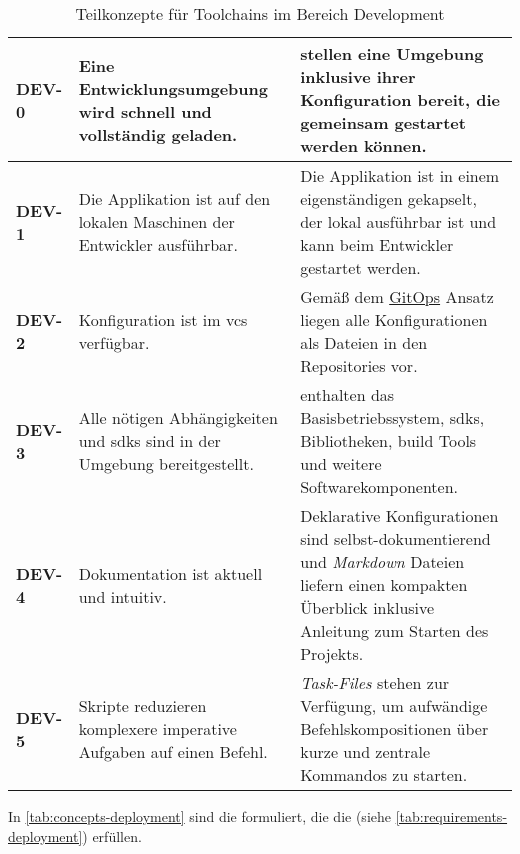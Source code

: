 \begin{table}[H]
    \begin{tabular}{ >{\bfseries\ttfamily}p{} >{}p{} | >{}p{} }
        DEV-0   &   Eine Entwicklungsumgebung wird schnell und vollständig geladen. &
        \nameref{subsec:05-01-02_dev-container} stellen eine Umgebung inklusive ihrer Konfiguration bereit, die gemeinsam gestartet werden können. \\
        \hline
        DEV-1   &   Die Applikation ist auf den lokalen Maschinen der Entwickler ausführbar. &
        Die Applikation ist in einem eigenständigen \nameref{subsec:05-01-01_docker-container} gekapselt, der lokal ausführbar ist und kann beim Entwickler gestartet werden. \\
        \hline
        DEV-2   &   Konfiguration ist im \Gls{vcs} verfügbar. &
        Gemäß dem \hyperref[sec:03-03_gitops]{GitOps} Ansatz liegen alle Konfigurationen als Dateien in den Repositories vor. \\
        \hline
        DEV-3   &   Alle nötigen Abhängigkeiten und \Glspl{sdk} sind in der Umgebung bereitgestellt. &
        \nameref{subsec:05-01-01_docker-container} enthalten das Basisbetriebssystem, \Glspl{sdk}, Bibliotheken, \Gls{build} Tools und weitere Softwarekomponenten. \\
        \hline
        DEV-4   &   Dokumentation ist aktuell und intuitiv. &
        Deklarative Konfigurationen sind selbst-dokumentierend und \textit{Markdown} Dateien liefern einen kompakten Überblick inklusive Anleitung zum Starten des Projekts. \\
        \hline
        DEV-5   &   Skripte reduzieren komplexere imperative Aufgaben auf einen Befehl. &
        \textit{Task-Files} stehen zur Verfügung, um aufwändige Befehlskompositionen über kurze und zentrale Kommandos zu starten. \\
    \end{tabular}
    \caption{Teilkonzepte für Toolchains im Bereich Development}
    \label{tab:concepts-development}
\end{table}

In \autoref{tab:concepts-deployment} sind die  formuliert, die die  (siehe \autoref{tab:requirements-deployment}) erfüllen.

